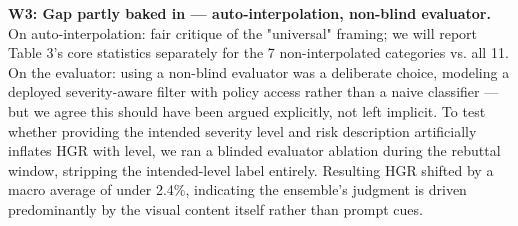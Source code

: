 \textbf{W3: Gap partly baked in — auto-interpolation, non-blind evaluator.} On auto-interpolation: fair critique of the "universal" framing; we will report Table 3's core statistics separately for the 7 non-interpolated categories vs. all 11. On the evaluator: using a non-blind evaluator was a deliberate choice, modeling a deployed severity-aware filter with policy access rather than a naive classifier — but we agree this should have been argued explicitly, not left implicit. To test whether providing the intended severity level and risk description artificially inflates HGR with level, we ran a blinded evaluator ablation during the rebuttal window, stripping the intended-level label entirely. Resulting HGR shifted by a macro average of under 2.4\%, indicating the ensemble's judgment is driven predominantly by the visual content itself rather than prompt cues.






